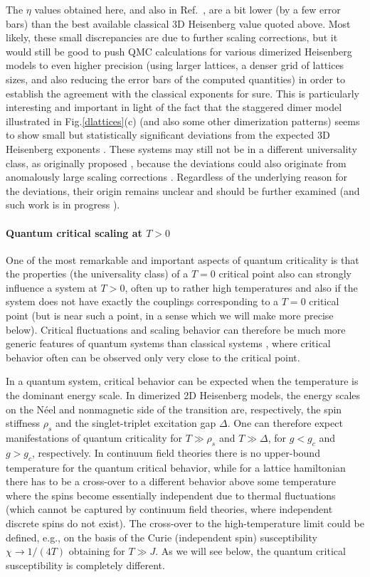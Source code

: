 \documentclass[draft,numberedheadings]{aipproc}
\begin{document}
The $\eta$ values obtained here, and also in Ref.~\cite{wenzel1}, are a bit lower (by a few error bars) than the best available classical 3D Heisenberg 
value \cite{series} quoted above. Most likely, these small discrepancies are due to further scaling corrections, but it would still be good to push QMC 
calculations for various dimerized Heisenberg models to even higher precision (using larger lattices, a denser grid of lattices sizes, and also reducing the 
error bars of the computed quantities) in order to establish the agreement with the classical exponents for sure. This is particularly interesting and 
important in light of the fact that the staggered dimer model illustrated in Fig.\ref{dlattices}(c) (and also some other dimerization patterns) seems to 
show small but statistically significant deviations from the expected 3D Heisenberg exponents \cite{wenzel2,jiang09,wessel10}. These systems may still not be 
in a different universality class, as originally proposed \cite{wenzel2}, because the deviations could also originate from anomalously large scaling corrections 
\cite{jiang09,wessel10}. Regardless of the underlying reason for the deviations, their origin remains unclear and should be further examined (and such 
work is in progress \cite{wessel10}).

\paragraph{Quantum critical scaling at $T>0$} One of the most remarkable and important aspects of quantum criticality is that the properties (the universality 
class) of a $T=0$ critical point also can strongly influence a system at $T>0$, often up to rather high temperatures \cite{chubukov} and also if the system 
does not have exactly the couplings corresponding to a $T=0$ critical point (but is near such a point, in a sense which we will make more precise below). 
Critical fluctuations and scaling behavior can therefore be much more generic features of quantum systems than classical systems \cite{sondhirpm}, where 
critical behavior often can be observed only very close to the critical point. 

In a quantum system, critical behavior can be expected when the temperature is the dominant energy scale. In dimerized 2D Heisenberg models, the energy
scales on the N\'eel and nonmagnetic side of the transition are, respectively, the spin stiffness $\rho_s$ and the singlet-triplet excitation gap $\Delta$. 
One can therefore expect manifestations of quantum criticality for $T\gg \rho_s$ and $T\gg \Delta$, for $g<g_c$ and $g>g_c$, respectively. In continuum
field theories there is no upper-bound temperature for the quantum critical behavior, while for a lattice hamiltonian there has to be a cross-over to a 
different behavior above some temperature where the spins become essentially independent due to thermal fluctuations (which cannot be captured by continuum 
field theories, where independent discrete spins do not exist). The cross-over to the high-temperature limit could be defined, e.g., on the basis of the 
Curie (independent spin) susceptibility $\chi \to 1/(4T)$ obtaining for $T \gg J$. As we will see below, the quantum critical susceptibility is completely 
different. 
\end{document}
